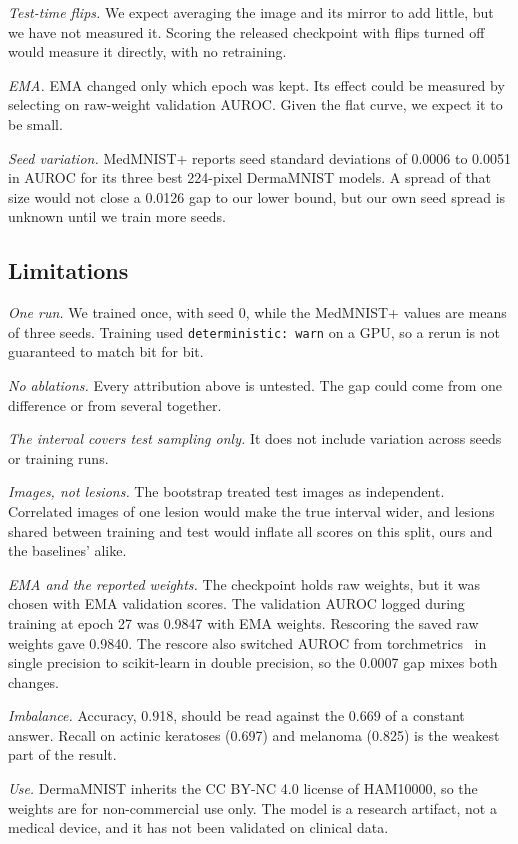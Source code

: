 \documentclass[conference]{IEEEtran}
\begin{document}
\emph{Test-time flips.} We expect averaging the image and its mirror to add little, but we have not measured it. Scoring the released checkpoint with flips turned off would measure it directly, with no retraining.

\emph{EMA.} EMA changed only which epoch was kept. Its effect could be measured by selecting on raw-weight validation AUROC. Given the flat curve, we expect it to be small.

\emph{Seed variation.} MedMNIST+ reports seed standard deviations of 0.0006 to 0.0051 in AUROC for its three best 224-pixel DermaMNIST models. A spread of that size would not close a 0.0126 gap to our lower bound, but our own seed spread is unknown until we train more seeds.

\subsection{Limitations}
\label{sec:limits}

\emph{One run.} We trained once, with seed 0, while the MedMNIST+ values are means of three seeds. Training used \texttt{deterministic: warn} on a GPU, so a rerun is not guaranteed to match bit for bit.

\emph{No ablations.} Every attribution above is untested. The gap could come from one difference or from several together.

\emph{The interval covers test sampling only.} It does not include variation across seeds or training runs.

\emph{Images, not lesions.} The bootstrap treated test images as independent. Correlated images of one lesion would make the true interval wider, and lesions shared between training and test would inflate all scores on this split, ours and the baselines' alike.

\emph{EMA and the reported weights.} The checkpoint holds raw weights, but it was chosen with EMA validation scores. The validation AUROC logged during training at epoch 27 was 0.9847 with EMA weights. Rescoring the saved raw weights gave 0.9840. The rescore also switched AUROC from torchmetrics~\cite{detlefsen2022torchmetrics} in single precision to scikit-learn in double precision, so the 0.0007 gap mixes both changes.

\emph{Imbalance.} Accuracy, 0.918, should be read against the 0.669 of a constant answer. Recall on actinic keratoses (0.697) and melanoma (0.825) is the weakest part of the result.

\emph{Use.} DermaMNIST inherits the CC BY-NC 4.0 license of HAM10000, so the weights are for non-commercial use only. The model is a research artifact, not a medical device, and it has not been validated on clinical data.
\end{document}
